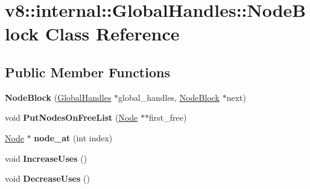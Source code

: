 \hypertarget{classv8_1_1internal_1_1_global_handles_1_1_node_block}{}\section{v8\+:\+:internal\+:\+:Global\+Handles\+:\+:Node\+Block Class Reference}
\label{classv8_1_1internal_1_1_global_handles_1_1_node_block}
\subsection*{Public Member Functions}
\begin{DoxyCompactItemize}
\item 
\hypertarget{classv8_1_1internal_1_1_global_handles_1_1_node_block_a6f3f4ad3ad8fc3185ef080d710d900c0}{}{\bfseries Node\+Block} (\hyperlink{classv8_1_1internal_1_1_global_handles}{Global\+Handles} $\ast$global\+\_\+handles, \hyperlink{classv8_1_1internal_1_1_global_handles_1_1_node_block}{Node\+Block} $\ast$next)\label{classv8_1_1internal_1_1_global_handles_1_1_node_block_a6f3f4ad3ad8fc3185ef080d710d900c0}

\item 
\hypertarget{classv8_1_1internal_1_1_global_handles_1_1_node_block_afa818cdc0b3346f12e42304c4f358ad3}{}void {\bfseries Put\+Nodes\+On\+Free\+List} (\hyperlink{classv8_1_1internal_1_1_global_handles_1_1_node}{Node} $\ast$$\ast$first\+\_\+free)\label{classv8_1_1internal_1_1_global_handles_1_1_node_block_afa818cdc0b3346f12e42304c4f358ad3}

\item 
\hypertarget{classv8_1_1internal_1_1_global_handles_1_1_node_block_ac98e55ac69269c50d8ecc233e670081c}{}\hyperlink{classv8_1_1internal_1_1_global_handles_1_1_node}{Node} $\ast$ {\bfseries node\+\_\+at} (int index)\label{classv8_1_1internal_1_1_global_handles_1_1_node_block_ac98e55ac69269c50d8ecc233e670081c}

\item 
\hypertarget{classv8_1_1internal_1_1_global_handles_1_1_node_block_aaffc8a8a872d639fcdc3376f4cbaac3f}{}void {\bfseries Increase\+Uses} ()\label{classv8_1_1internal_1_1_global_handles_1_1_node_block_aaffc8a8a872d639fcdc3376f4cbaac3f}

\item 
\hypertarget{classv8_1_1internal_1_1_global_handles_1_1_node_block_ab9a674fa6b8d63412c9933d2f7f81d80}{}void {\bfseries Decrease\+Uses} ()\label{classv8_1_1internal_1_1_global_handles_1_1_node_block_ab9a674fa6b8d63412c9933d2f7f81d80}


\end{DoxyCompactItemize}
